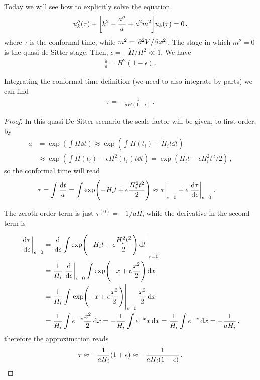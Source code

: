 \documentclass[main.tex]{subfiles}
\begin{document}

Today we will see how to explicitly solve the equation 
%
\begin{align}
u''_k (\tau )
+ 
\qty[k^2 - \frac{a''}{a} + a^2 m^2] u_k (\tau ) = 0
\,,
\end{align}
%
where \(\tau \) is the conformal time, while \(m^2 = \pdv*[2]{V}{\varphi }\). 
The stage in which \(m^2 = 0\) is the quasi de-Sitter stage. 
Then, \(\epsilon = - \dot{H} / H^2 \ll 1\). 
We have 
%
\begin{align}
\frac{\ddot{a}}{a} = H^2 ( 1- \epsilon )
\,.
\end{align}

\begin{claim}

Integrating the conformal time definition (we need to also integrate by parts) we can find 
%
\begin{align}
\tau = - \frac{1}{a H (1 - \epsilon )}
\,.
\end{align}
\end{claim}
\begin{proof}
In this quasi-De-Sitter scenario the scale factor will be given, to first order, by 
%
\begin{align}
a &= \exp(\int H \dd{t}) \approx \exp(\int H(t_i) + \dot{H}_i t \dd{t})  \\
&\approx \exp(\int H(t_i) - \epsilon H^2(t_i) t \dd{t} ) = \exp(H_i t - \epsilon H_i^2 t^2 /2)
\,,
\end{align}
%
so the conformal time will read 
%
\begin{align}
\tau &= \int \frac{ \dd{t}}{a} = \int \exp(- H_i t + \epsilon \frac{H_i^2t^2}{2}) \approx \eval{\tau }_{\epsilon =0} + \epsilon \eval{\dv{\tau }{\epsilon }}_{\epsilon = 0}
\,.
\end{align}

The zeroth order term is just \(\tau^{(0)} = - 1/ aH\), while the derivative in the second term is 
%
\begin{align}
\eval{\dv{\tau }{\epsilon }}_{\epsilon = 0} &= \eval{\dv{}{\epsilon } \int \exp(- H_i t + \epsilon \frac{H_i^2t^2}{2}) \dd{t}}_{\epsilon =0}   \\
&= \frac{1}{H_i} \eval{\dv{}{\epsilon }}_{\epsilon = 0} \int \exp(-x + \epsilon \frac{x^2}{2}) \dd{x}  \\
&= \frac{1}{H_i} \int \eval{\exp(- x + \epsilon \frac{x^2}{2})}_{\epsilon = 0 } \frac{x^2}{2} \dd{x}  \\
&= \frac{1}{H_i} \int e^{-x} \frac{x^2}{2} \dd{x} 
= - \frac{1}{H_i} \int e^{-x} x \dd{x} = \frac{1}{H_i} \int e^{-x} \dd{x} = - \frac{1}{a H_i}
\,,
\end{align}
%
therefore the approximation reads 
%
\begin{align}
\tau \approx - \frac{1}{a H_i} \qty(1 + \epsilon ) \approx - \frac{1}{a H_i (1 - \epsilon )} 
\,.
\end{align}
\end{proof}
\end{document}
